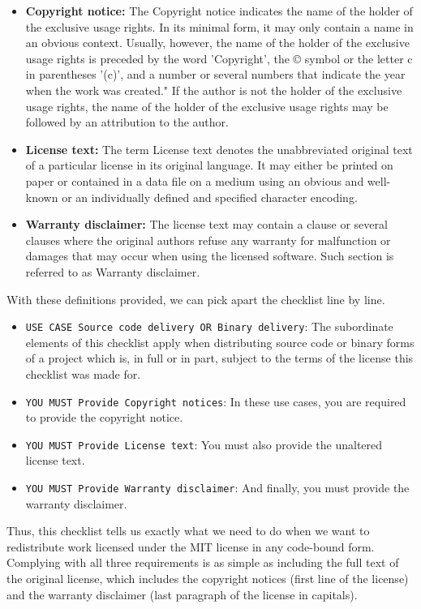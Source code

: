 \begin{itemize}
	\item \textbf{Copyright notice:} The Copyright notice indicates the name of the holder of the exclusive usage rights. In its minimal form, it may only contain a name in an obvious context. Usually, however, the name of the holder of the exclusive usage rights is preceded by the word 'Copyright', the © symbol or the letter c in parentheses '(c)', and a number or several numbers that indicate the year when the work was created." If the author is not the holder of the exclusive usage rights, the name of the holder of the exclusive usage rights may be followed by an attribution to the author.
	\item \textbf{License text:} The term License text denotes the unabbreviated original text of a particular license in its original language. It may either be printed on paper or contained in a data file on a medium using an obvious and well-known or an individually defined and specified character encoding.
	\item \textbf{Warranty disclaimer:} The license text may contain a clause or several clauses where the original authors refuse any warranty for malfunction or damages that may occur when using the licensed software. Such section is referred to as Warranty disclaimer.
\end{itemize}

With these definitions provided, we can pick apart the checklist line by line.

\begin{itemize}
	\item \verb*|USE CASE Source code delivery OR Binary delivery|: The subordinate elements of this checklist apply when distributing source code or binary forms of a project which is, in full or in part, subject to the terms of the license this checklist was made for.
	\item \verb*|YOU MUST Provide Copyright notices|: In these use cases, you are required to provide the copyright notice.
	\item \verb*|YOU MUST Provide License text|: You must also provide the unaltered license text.
	\item \verb*|YOU MUST Provide Warranty disclaimer|: And finally, you must provide the warranty disclaimer.
\end{itemize}

Thus, this checklist tells us exactly what we need to do when we want to redistribute work licensed under the MIT license in any code-bound form. Complying with all three requirements is as simple as including the full text of the original license, which includes the copyright notices (first line of the license) and the warranty disclaimer (last paragraph of the license in capitals).

